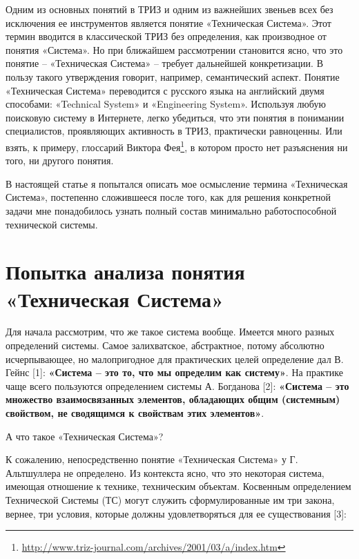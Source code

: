 \documentclass[11pt,a4paper]{article}
\begin{document}
Одним из основных понятий в ТРИЗ и одним из важнейших звеньев всех без
исключения ее инструментов является понятие «Техническая Система». Этот термин
вводится в классической ТРИЗ без определения, как производное от понятия
«Система». Но при ближайшем рассмотрении становится ясно, что это понятие –
«Техническая Система» – требует дальнейшей конкретизации. В пользу такого
утверждения говорит, например, семантический аспект. Понятие «Техническая
Система» переводится с русского языка на английский двумя способами:
«Technical System» и «Engineering System». Используя любую поисковую систему в
Интернете, легко убедиться, что эти понятия в понимании специалистов,
проявляющих активность в ТРИЗ, практически равноценны. Или взять, к примеру,
глоссарий Виктора
Фея\footnote{\url{http://www.triz-journal.com/archives/2001/03/a/index.htm}},
в котором просто нет разъяснения ни того, ни другого понятия.

В настоящей статье я попытался описать мое осмысление термина «Техническая
Система», постепенно сложившееся после того, как для решения конкретной задачи
мне понадобилось узнать полный состав минимально работоспособной технической
системы.

\section*{Попытка анализа понятия «Техническая Система»}

Для начала рассмотрим, что же такое система вообще.  Имеется много разных
определений системы. Самое залихватское, абстрактное, потому абсолютно
исчерпывающее, но малопригодное для практических целей определение дал
В. Гейнс [1]: \textbf{«Система – это то, что мы определим как систему»}. На
практике чаще всего пользуются определением системы А. Богданова [2]:
\textbf{«Система – это множество взаимосвязанных элементов, обладающих общим
  (системным) свойством, не сводящимся к свойствам этих элементов»}.

А что такое «Техническая Система»? 

К сожалению, непосредственно понятие «Техническая Система» у Г. Альтшуллера не
определено. Из контекста ясно, что это некоторая система, имеющая отношение к
технике, техническим объектам. Косвенным определением Технической Системы (ТС)
могут служить сформулированные им три закона, вернее, три условия, которые
должны удовлетворяться для ее существования [3]:
\end{document}
